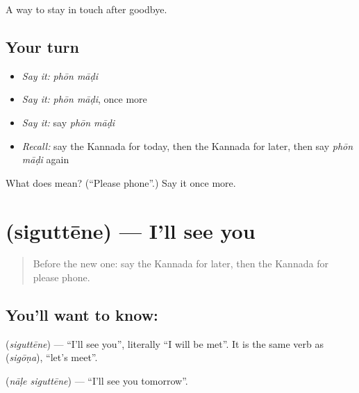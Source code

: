 \begin{grammarlens}[title={What you've built}]
A way to stay in touch after goodbye.
\end{grammarlens}

\subsection*{Your turn}
\begin{itemize}
\raggedright
  \item \emph{Say it:} \emph{phōn māḍi}
  \item \emph{Say it:} \emph{phōn māḍi}, once more
  \item \emph{Say it:} say \emph{phōn māḍi}
  \item \emph{Recall:} say the Kannada for today, then the Kannada for later, then say \emph{phōn māḍi} again
\end{itemize}

\begin{tcolorbox}[breakable,colback=teal!4,colframe=teal!35!black,title={Before you move on}]
What does   mean? (\textquotedblleft{}Please phone\textquotedblright{}.) Say it once more.
\end{tcolorbox}
\section[\texorpdfstring{\kn{ಸಿಗುತ್ತೇನೆ} (siguttēne)}{ಸಿಗುತ್ತೇನೆ (siguttēne)}]{ (siguttēne) — I'll see you}

\label{lesson:KA-C106-seeyou}



\begin{quote}
Before the new one: say the Kannada for later, then the Kannada for please phone.
\end{quote}

\subsection*{You'll want to know: }
\textbf{} (\emph{siguttēne}) — \textquotedblleft{}I'll see you\textquotedblright{}, literally \textquotedblleft{}I will be met\textquotedblright{}. It is the same verb as \textbf{} (\emph{sigōṇa}), \textquotedblleft{}let's meet\textquotedblright{}.

\textbf{ } (\emph{nāḷe siguttēne}) — \textquotedblleft{}I'll see you tomorrow\textquotedblright{}.

